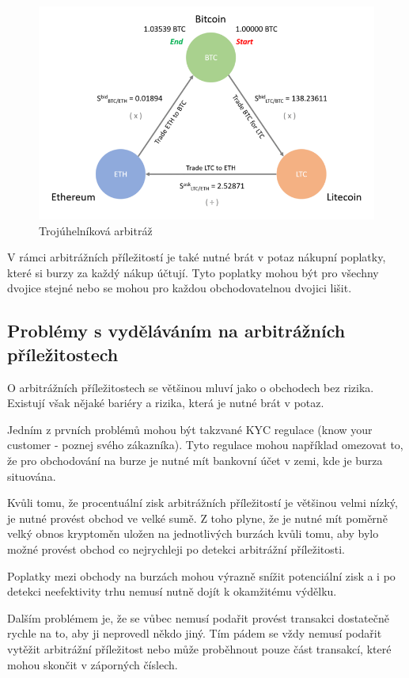 \documentclass[thesis=B,czech]{FITthesis}[2019/03/21]
\begin{document}
\begin{figure}\centering
	\includegraphics[width=1\textwidth]{images/ZMENIT-triangle.png}
	\caption{Trojúhelníková arbitráž}\label{triangle_arbitrage}
\end{figure}
V rámci arbitrážních příležitostí je také nutné brát v potaz nákupní poplatky, které si burzy za každý nákup účtují. Tyto poplatky mohou být pro všechny dvojice stejné nebo se mohou pro každou obchodovatelnou dvojici lišit.  

\subsection{Problémy s vyděláváním na arbitrážních příležitostech}
O arbitrážních příležitostech se většinou mluví jako o obchodech bez rizika. Existují však nějaké bariéry a rizika, která je nutné brát v potaz.

Jedním z prvních problémů mohou být takzvané KYC regulace (know your customer - poznej svého zákazníka). Tyto regulace mohou například omezovat to, že pro obchodování na burze je nutné mít bankovní účet v zemi, kde je burza situována.

Kvůli tomu, že procentuální zisk arbitrážních příležitostí je většinou velmi nízký, je nutné provést obchod ve velké sumě. Z toho plyne, že je nutné mít poměrně velký obnos kryptoměn uložen na jednotlivých burzách kvůli tomu, aby bylo možné provést obchod co nejrychleji po detekci arbitrážní příležitosti. 

Poplatky mezi obchody na burzách mohou výrazně snížit potenciální zisk a i po detekci neefektivity trhu nemusí nutně dojít k okamžitému výdělku.  

Dalším problémem je, že se vůbec nemusí podařit provést transakci dostatečně rychle na to, aby ji neprovedl někdo jiný. Tím pádem se vždy nemusí podařit vytěžit arbitrážní příležitost nebo může proběhnout pouze část transakcí, které mohou skončit v záporných číslech.
\end{document}
